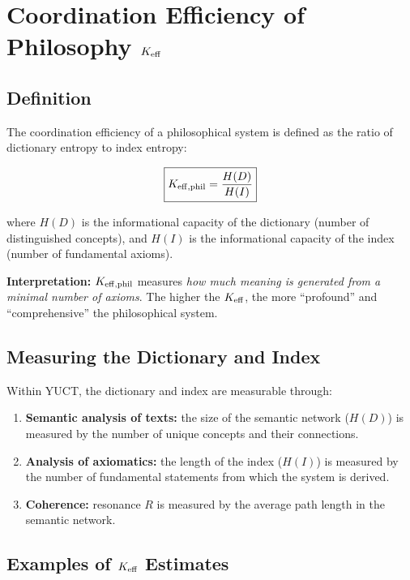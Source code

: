 \documentclass[12pt,a4paper]{article}
\begin{document}
	\section{Coordination Efficiency of Philosophy \texorpdfstring{\(\Keff\)}{K\_eff}}
	
	\subsection{Definition}
	
	The coordination efficiency of a philosophical system is defined as the ratio of dictionary entropy to index entropy:
	
	\begin{equation}
		\boxed{
			\Keff[\text{phil}] = \frac{H(D)}{H(I)}
		}
		\label{eq:keff-phil}
	\end{equation}
	
	where \(H(D)\) is the informational capacity of the dictionary (number of distinguished concepts), and \(H(I)\) is the informational capacity of the index (number of fundamental axioms).
	
	\textbf{Interpretation:} \(\Keff[\text{phil}]\) measures \emph{how much meaning is generated from a minimal number of axioms}. The higher the \(\Keff\), the more ``profound'' and ``comprehensive'' the philosophical system.
	
	\subsection{Measuring the Dictionary and Index}
	
	Within YUCT, the dictionary and index are measurable through:
	
	\begin{enumerate}
		\item \textbf{Semantic analysis of texts:} the size of the semantic network (\(H(D)\)) is measured by the number of unique concepts and their connections.
		\item \textbf{Analysis of axiomatics:} the length of the index (\(H(I)\)) is measured by the number of fundamental statements from which the system is derived.
		\item \textbf{Coherence:} resonance \(R\) is measured by the average path length in the semantic network.
	\end{enumerate}
	
	\subsection{Examples of \texorpdfstring{\(\Keff\)}{K\_eff} Estimates}
	
\end{document}
